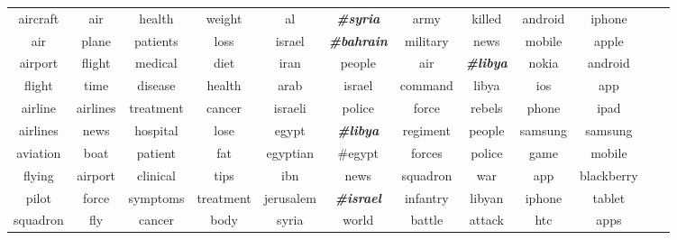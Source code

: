 \documentclass{beamer}
\begin{document}
\begin{frame}
\begin{table}
{\begin{tabular}{|cc|cc|cc|cc|cc|cc|}
\hline
aircraft & air & health & weight & al & \textbf{\textit{\#syria}} & army & killed & android & iphone\\ 
air & plane & patients & loss & israel & \textbf{\textit{\#bahrain}} & military & news & mobile & apple \\ 
airport & flight & medical & diet & iran & people & air & \textbf{\textit{\#libya}} & nokia & android \\ 
flight & time & disease & health & arab & israel & command & libya & ios & app \\
airline & airlines & treatment & cancer & israeli & police & force & rebels & phone & ipad \\
airlines & news & hospital & lose & egypt & \textbf{\textit{\#libya}} & regiment & people & samsung & samsung \\
aviation & boat & patient & fat & egyptian & \#egypt & forces & police & game & mobile\\
flying & airport & clinical & tips & ibn & news & squadron & war & app & blackberry \\
pilot & force & symptoms & treatment & jerusalem & \textbf{\textit{\#israel}} & infantry & libyan & iphone & tablet \\
squadron & fly & cancer & body & syria & world & battle & attack & htc & apps\\
\hline
\end{tabular}
}
\label{tbl:historyStates}
\end{table}
\end{frame}
\end{document}
